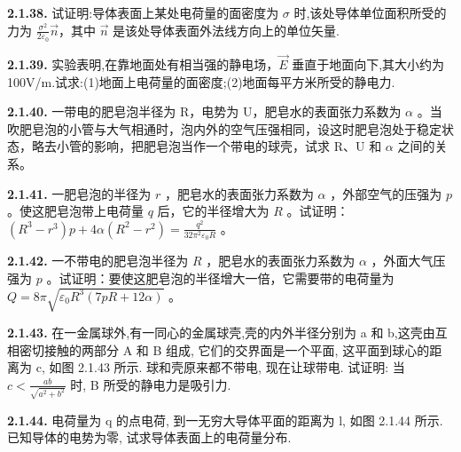 \textbf{2.1.38.} 试证明:导体表面上某处电荷量的面密度为 $\sigma$ 时,该处导体单位面积所受的力为 $\displaystyle \frac{\sigma^{2}}{2\varepsilon_{0}}\vec{n}$，其中 $\vec{n}$ 是该处导体表面外法线方向上的单位矢量.

\vfill
\newpage

\textbf{2.1.39.} 实验表明,在靠地面处有相当强的静电场，$\vec{E}$ 垂直于地面向下,其大小约为100V/m.试求:(1)地面上电荷量的面密度;(2)地面每平方米所受的静电力.

\vfill
\newpage

\textbf{2.1.40.} 一带电的肥皂泡半径为 R，电势为 U，肥皂水的表面张力系数为 $\alpha$ 。当吹肥皂泡的小管与大气相通时，泡内外的空气压强相同，设这时肥皂泡处于稳定状态，略去小管的影响，把肥皂泡当作一个带电的球壳，试求 R、U 和 $\alpha$ 之间的关系。

\vfill
\newpage

\textbf{2.1.41.} 一肥皂泡的半径为 $r$ ，肥皂水的表面张力系数为 $\alpha$ ，外部空气的压强为 $p$ 。使这肥皂泡带上电荷量 $q$ 后，它的半径增大为 $R$ 。试证明： $\displaystyle (R^3 - r^3)p + 4\alpha (R^2 - r^2) = \frac{q^2}{32\pi^2\varepsilon_0R}$ 。

\vfill
\newpage

\textbf{2.1.42.} 一不带电的肥皂泡半径为 $R$ ，肥皂水的表面张力系数为 $\alpha$ ，外面大气压强为 $p$ 。试证明：要使这肥皂泡的半径增大一倍，它需要带的电荷量为 $Q = 8\pi \sqrt{\varepsilon_0 R^3 (7pR + 12\alpha)}$ 。

\vfill
\newpage

\textbf{2.1.43.} 在一金属球外,有一同心的金属球壳,壳的内外半径分别为 a 和 b,这壳由互相密切接触的两部分 A 和 B 组成, 它们的交界面是一个平面, 这平面到球心的距离为 c, 如图 2.1.43 所示. 球和壳原来都不带电, 现在让球带电. 试证明: 当 $\displaystyle c < \frac{ab}{\sqrt{a^{2} + b^{2}}}$ 时, B 所受的静电力是吸引力.

\begin{center}
\end{center}

\vfill
\newpage

\textbf{2.1.44.} 电荷量为 q 的点电荷, 到一无穷大导体平面的距离为 l, 如图 2.1.44 所示. 已知导体的电势为零, 试求导体表面上的电荷量分布.

\begin{center}
\end{center}

\vfill
\newpage

